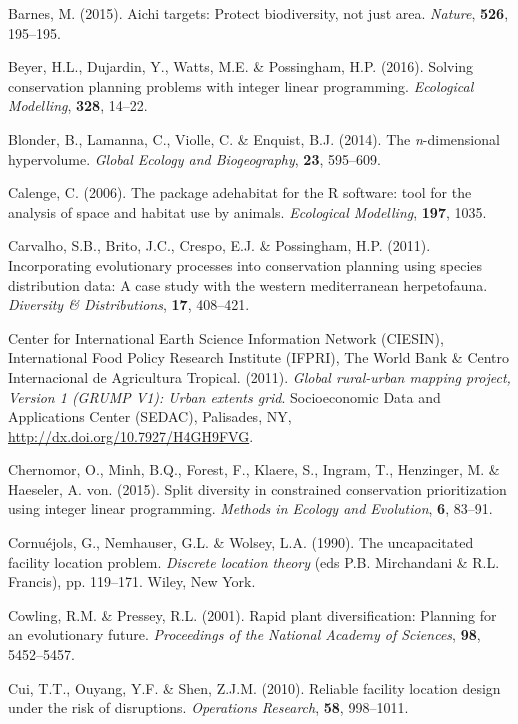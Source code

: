 \hypertarget{ref-r492}{}
Barnes, M. (2015). Aichi targets: Protect biodiversity, not just area.
\emph{Nature}, \textbf{526}, 195--195.

\hypertarget{ref-r426}{}
Beyer, H.L., Dujardin, Y., Watts, M.E. \& Possingham, H.P. (2016).
Solving conservation planning problems with integer linear programming.
\emph{Ecological Modelling}, \textbf{328}, 14--22.

\hypertarget{ref-r231}{}
Blonder, B., Lamanna, C., Violle, C. \& Enquist, B.J. (2014). The
\emph{n}-dimensional hypervolume. \emph{Global Ecology and
Biogeography}, \textbf{23}, 595--609.

\hypertarget{ref-r455}{}
Calenge, C. (2006). The package adehabitat for the R software: tool for
the analysis of space and habitat use by animals. \emph{Ecological
Modelling}, \textbf{197}, 1035.

\hypertarget{ref-r2}{}
Carvalho, S.B., Brito, J.C., Crespo, E.J. \& Possingham, H.P. (2011).
Incorporating evolutionary processes into conservation planning using
species distribution data: A case study with the western mediterranean
herpetofauna. \emph{Diversity \& Distributions}, \textbf{17}, 408--421.

\hypertarget{ref-r456}{}
Center for International Earth Science Information Network (CIESIN),
International Food Policy Research Institute (IFPRI), The World Bank \&
Centro Internacional de Agricultura Tropical. (2011). \emph{Global
rural-urban mapping project, Version 1 (GRUMP V1): Urban extents grid}.
Socioeconomic Data and Applications Center (SEDAC), Palisades, NY,
\url{http://dx.doi.org/10.7927/H4GH9FVG}.

\hypertarget{ref-r485}{}
Chernomor, O., Minh, B.Q., Forest, F., Klaere, S., Ingram, T.,
Henzinger, M. \& Haeseler, A. von. (2015). Split diversity in
constrained conservation prioritization using integer linear
programming. \emph{Methods in Ecology and Evolution}, \textbf{6},
83--91.

\hypertarget{ref-r451}{}
Cornuéjols, G., Nemhauser, G.L. \& Wolsey, L.A. (1990). The
uncapacitated facility location problem. \emph{Discrete location theory}
(eds P.B. Mirchandani \& R.L. Francis), pp. 119--171. Wiley, New York.

\hypertarget{ref-r9}{}
Cowling, R.M. \& Pressey, R.L. (2001). Rapid plant diversification:
Planning for an evolutionary future. \emph{Proceedings of the National
Academy of Sciences}, \textbf{98}, 5452--5457.

\hypertarget{ref-r16}{}
Cui, T.T., Ouyang, Y.F. \& Shen, Z.J.M. (2010). Reliable facility
location design under the risk of disruptions. \emph{Operations
Research}, \textbf{58}, 998--1011.

